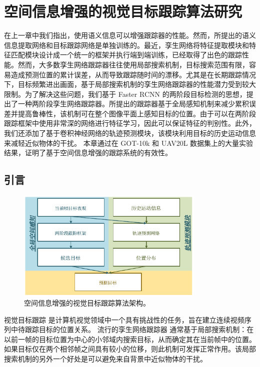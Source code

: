 \chapter{空间信息增强的视觉目标跟踪算法研究}\label{chap:globally}
在上一章中我们指出，使用语义信息可以增强跟踪器的性能。然而，所提出的语义信息提取网络和目标跟踪网络是单独训练的。最近，孪生网络将特征提取模块和特征匹配模块设计成一个统一的框架并执行端到端训练，已经取得了出色的跟踪性能。然而，大多数孪生网络跟踪器往往使用局部搜索机制，目标搜索范围有限，容易造成预测位置的累计误差，从而导致跟踪随时间的漂移。尤其是在长期跟踪情况下，目标频繁进出画面，基于局部搜索机制的孪生网络跟踪器的性能潜力受到较大限制。为了解决这些问题，我们基于 Faster RCNN \cite{ren2015faster} 的两阶段目标检测的思想，提出了一种两阶段孪生网络跟踪器。所提出的跟踪器基于全局感知机制来减少累积误差并提高鲁棒性，该机制可在整个图像平面上感知目标的位置。由于可以在两阶段跟踪框架中使用非常深的网络进行特征学习，因此可以保证特征的判别性。此外，我们还添加了基于卷积神经网络的轨迹预测模块，该模块利用目标的历史运动信息来减轻近似物体的干扰。
本章通过在 GOT-10k \cite{GOT-10k} 和 UAV20L \cite{mueller2016benchmark} 数据集上的大量实验结果，证明了基于空间信息增强的跟踪系统的有效性。

\section{引言}

\begin{figure}[t]
	\centering
    \includegraphics[width=0.8\textwidth]{Img/globally/Arch7.pdf}
    \caption{空间信息增强的视觉目标跟踪算法架构。}
\end{figure}

视觉目标跟踪 \cite{Leang2018OnlineFO, Wang2019VisualOT, Zhang2018UsingFL} 是计算机视觉领域中一个具有挑战性的任务，旨在建立连续视频序列中待跟踪目标的位置关系。
流行的孪生网络跟踪器 \cite{SiamFC, SiamRPN, Wang2018SiamMask} 通常基于局部搜索机制：在以前一帧的目标位置为中心的小邻域内搜索目标，从而确定其在当前帧中的位置。
如果目标仅在两个相邻帧之间具有较小的位移，则此机制可发挥正常作用。该局部搜索机制的另外一个好处是可以避免来自背景中近似物体的干扰。

